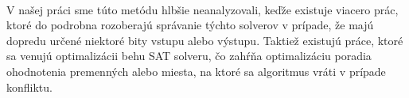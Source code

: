 \paragraph{}
V našej práci sme túto metódu hlbšie neanalyzovali, keďže existuje viacero prác, ktoré do podrobna rozoberajú správanie týchto solverov v prípade, že majú dopredu určené niektoré bity vstupu alebo výstupu. Taktiež existujú práce, ktoré sa venujú optimalizácii behu SAT solveru, čo zahŕňa optimalizáciu poradia ohodnotenia premenných alebo miesta, na ktoré sa algoritmus vráti v prípade konfliktu. 